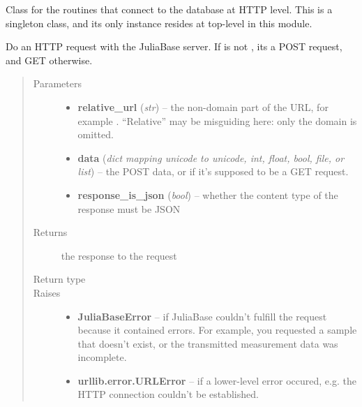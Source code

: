\documentclass[a4paper,11pt,english]{sphinxmanual}
\begin{document}

\begin{fulllineitems}
\label{programming/remote_client:jb_remote.common.JuliaBaseConnection}
Class for the routines that connect to the database at HTTP level.
This is a singleton class, and its only instance resides at top-level in
this module.

\begin{fulllineitems}
\label{programming/remote_client:jb_remote.common.JuliaBaseConnection.open}
Do an HTTP request with the JuliaBase server.  If  is not
, its a POST request, and GET otherwise.
\begin{quote}\begin{description}
\item[{Parameters}] \leavevmode\begin{itemize}
\item {} 
\textbf{relative\_url} (\emph{str}) -- the non-domain part of the URL, for example
.  “Relative” may be misguiding here: only
the domain is omitted.

\item {} 
\textbf{data} (\emph{dict mapping unicode to unicode, int, float, bool, file, or
list}) -- the POST data, or  if it's supposed to be a GET
request.

\item {} 
\textbf{response\_is\_json} (\emph{bool}) -- whether the content type of the response must
be JSON

\end{itemize}

\item[{Returns}] \leavevmode
the response to the request

\item[{Return type}] \leavevmode
{}

\item[{Raises}] \leavevmode\begin{itemize}
\item {} 
\textbf{JuliaBaseError} -- if JuliaBase couldn't fulfill the request
because it contained errors.  For example, you requested a sample
that doesn't exist, or the transmitted measurement data was
incomplete.

\item {} 
\textbf{urllib.error.URLError} -- if a lower-level error occured, e.g. the
HTTP connection couldn't be established.

\end{itemize}

\end{description}\end{quote}

\end{fulllineitems}


\end{fulllineitems}
\end{document}
